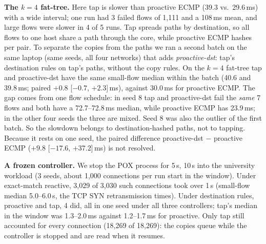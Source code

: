 \documentclass[conference]{IEEEtran}
\begin{document}
\textbf{The $k{=}4$ fat-tree.} Here tap is slower than proactive ECMP (39.3 vs.\ 29.6\,ms) with a wide interval; one run had 3 failed flows of 1,111 and a 108\,ms mean, and large flows were slower in 4 of 5 runs. Tap spreads paths by destination, so all flows to one host share a path through the core, while proactive ECMP hashes per pair. To separate the copies from the paths we ran a second batch on the same laptop (same seeds, all four networks) that adds \emph{proactive-dst}: tap's destination rules on tap's paths, without the copy rules. On the $k{=}4$ fat-tree tap and proactive-dst have the same small-flow median within the batch (40.6 and 39.8\,ms; paired $+0.8$ [$-0.7$, $+2.3$]\,ms), against 30.0\,ms for proactive ECMP. The gap comes from one flow schedule: in seed 8 tap and proactive-dst fail the \emph{same} 7 flows and both have a 72.7--72.8\,ms median, while proactive ECMP has 23.9\,ms; in the other four seeds the three are mixed. Seed 8 was also the outlier of the first batch. So the slowdown belongs to destination-hashed paths, not to tapping. Because it rests on one seed, the paired difference proactive-dst $-$ proactive ECMP ($+9.8$ [$-17.6$, $+37.2$]\,ms) is not resolved.

\textbf{A frozen controller.} We stop the POX process for 5\,s, 10\,s into the university workload (3 seeds, about 1,000 connections per run start in the window). Under exact-match reactive, 3,029 of 3,030 such connections took over 1\,s (small-flow median 5.0--6.0\,s, the TCP SYN retransmission times). Under destination rules, proactive and tap, 4 did, all in one seed under all three controllers; tap's median in the window was 1.3--2.0\,ms against 1.2--1.7\,ms for proactive. Only tap still accounted for every connection (18,269 of 18,269): the copies queue while the controller is stopped and are read when it resumes.
\end{document}
